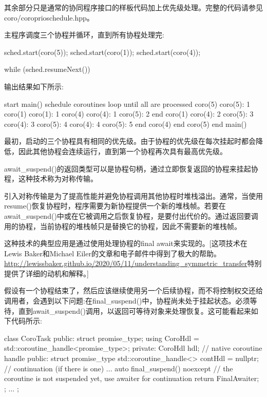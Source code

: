 其余部分只是通常的协同程序接口的样板代码加上优先级处理。完整的代码请参见coro/coroprioschedule.hpp。

主程序调度三个协程并循环，直到所有协程处理完:

\begin{cpp}
sched.start(coro(5));
sched.start(coro(1));
sched.start(coro(4));

while (sched.resumeNext()) {
}
\end{cpp}

输出结果如下所示:

\begin{shell}
start main()
schedule coroutines
loop until all are processed
	coro(5)
	coro(5): 1
	coro(1)
	coro(1): 1
	coro(4)
	coro(4): 1
	coro(5): 2
	end coro(1)
	coro(4): 2
	coro(5): 3
	coro(4): 3
	coro(5): 4
	coro(4): 4
	coro(5): 5
	end coro(4)
	end coro(5)
end main()
\end{shell}

最初，启动的三个协程具有相同的优先级。由于协程的优先级在每次挂起时都会降低，因此其他协程会连续运行，直到第一个协程再次具有最高优先级。


await\_suspend()的返回类型可以是协程句柄，通过立即恢复返回的协程来挂起协程，这种技术称为对称传输。

引入对称传输是为了提高性能并避免协程调用其他协程时堆栈溢出。通常，当使用resume()恢复协程时，程序需要为新协程提供一个新的堆栈帧。若要在await\_suspend()中或在它被调用之后恢复协程，是要付出代价的。通过返回要调用的协程，当前协程的堆栈帧只是替换它的协程，因此不需要新的堆栈帧。


这种技术的典型应用是通过使用处理协程的final await来实现的。[这项技术在Lewis Baker和Michael Eiler的文章和电子邮件中得到了极大的帮助。\url{http://lewissbaker.github.io/2020/05/11/understanding_symmetric_transfer}特别提供了详细的动机和解释。]

假设有一个协程结束了，然后应该继续使用另一个后续协程，而不将控制权交还给调用者，会遇到以下问题:在final\_suspend()中，协程尚未处于挂起状态。必须等待，直到await\_suspend()调用，以返回可等待对象来处理恢复。这可能看起来如下代码所示:

\begin{cpp}
class CoroTask
{
public:
	struct promise_type;
	using CoroHdl = std::coroutine_handle<promise_type>;
private:
	CoroHdl hdl; // native coroutine handle
public:
	struct promise_type {
		std::coroutine_handle<> contHdl = nullptr; // continuation (if there is one)
		...
		auto final_suspend() noexcept {
			// the coroutine is not suspended yet, use awaiter for continuation
			return FinalAwaiter{};
		}
	};
	...
};
\end{cpp}

